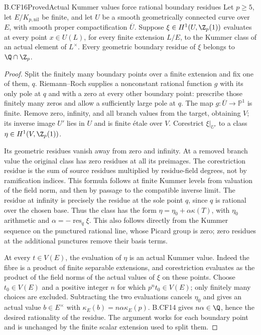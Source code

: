 \begin{claim}{B.CF16}{Proved}{Actual Kummer values force rational boundary residues}
Let \(p\geq5\), let \(E/K_{p,\mathrm{nil}}\) be finite,
and let \(U\) be a smooth geometrically connected curve over
\(E\), with smooth proper compactification \(\overline U\).
Suppose \(\xi\in H^1(U,\Z_p(1))\) evaluates at every point
\(x\in U(L)\), for every finite extension \(L/E\), to the
Kummer class of an actual element of \(L^\times\).
Every geometric boundary residue of \(\xi\) belongs to
\(\Q\cap\Z_p\).
\end{claim}
\begin{proof}
Split the finitely many boundary points over a finite extension
and fix one of them, \(q\). Riemann--Roch supplies a nonconstant
rational function \(g\) with its only pole at \(q\) and with a
zero at every other boundary point: prescribe those finitely
many zeros and allow a sufficiently large pole at \(q\).
The map \(g:\overline U\to\mathbb P^1\) is finite.
Remove zero, infinity, and all branch values from the target,
obtaining \(V\); its inverse image \(U'\) lies in \(U\)
and is finite étale over \(V\). Corestrict \(\xi|_{U'}\)
to a class \(\eta\in H^1(V,\Z_p(1))\).

Its geometric residues vanish away from zero and infinity.
At a removed branch value the original class has zero
residues at all its preimages. The corestriction residue
is the sum of source residues multiplied by residue-field
degrees, not by ramification indices. This formula follows
at finite Kummer levels from valuation of the field norm,
and then by passage to the compatible inverse limit.
The residue at infinity is precisely the residue at the
sole point \(q\), since \(q\) is rational over the chosen
base. Thus the class has the form
\(\eta=\eta_0+\alpha\kappa(T)\), with \(\eta_0\) arithmetic
and \(\alpha=-\operatorname{res}_q\xi\). This also follows
directly from the Kummer sequence on the punctured rational
line, whose Picard group is zero; zero residues at the
additional punctures remove their basis terms.

At every \(t\in V(E)\), the evaluation of \(\eta\) is
an actual Kummer value. Indeed the fibre is a product of
finite separable extensions, and corestriction evaluates
as the product of the field norms of the actual values
of \(\xi\) on these points. Choose \(t_0\in V(E)\) and
a positive integer \(n\) for which \(p^nt_0\in V(E)\);
only finitely many choices are excluded. Subtracting the
two evaluations cancels \(\eta_0\) and gives an actual
value \(b\in E^\times\) with
\(\kappa_E(b)=n\alpha\kappa_E(p)\).
B.CF14 gives \(n\alpha\in\Q\), hence the desired
rationality of the residue. The argument works for each
boundary point and is unchanged by the finite scalar
extension used to split them.
\end{proof}

